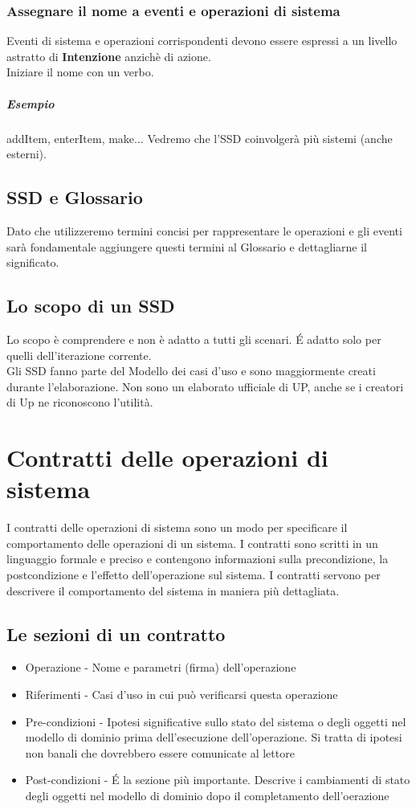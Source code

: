 \subsection*{Assegnare il nome a eventi e operazioni di sistema}
Eventi di sistema e operazioni corrispondenti devono essere espressi a un livello 
astratto di \textbf{Intenzione} anzichè di azione.
\\ Iniziare il nome con un verbo.
\paragraph*{Esempio} addItem, enterItem, make... 
Vedremo che l'SSD coinvolgerà più sistemi (anche esterni).
\section{SSD e Glossario}
Dato che utilizzeremo termini concisi per rappresentare le operazioni e gli eventi sarà fondamentale
aggiungere questi termini al Glossario e dettagliarne il significato.
\section{Lo scopo di un SSD}
Lo scopo è comprendere e non è adatto a tutti gli scenari. \'E adatto solo per quelli dell'iterazione
corrente.
\\ Gli SSD fanno parte del Modello dei casi d'uso e sono maggiormente creati durante l'elaborazione.
Non sono un elaborato ufficiale di UP, anche se i creatori di Up ne riconoscono l'utilità.

\chapter{Contratti delle operazioni di sistema}
I contratti delle operazioni di sistema sono un modo per specificare il comportamento delle operazioni
di un sistema. I contratti sono scritti in un linguaggio formale e preciso e contengono
informazioni sulla precondizione, la postcondizione e l'effetto dell'operazione sul sistema.
I contratti servono per descrivere il comportamento del sistema in maniera più dettagliata.
\section{Le sezioni di un contratto}
\begin{itemize}
    \item Operazione - Nome e parametri (firma) dell'operazione
    \item Riferimenti - Casi d'uso in cui può verificarsi questa operazione
    \item Pre-condizioni - Ipotesi significative sullo stato del sistema o degli oggetti nel modello
    di dominio prima dell'esecuzione dell'operazione. Si tratta di ipotesi non banali che dovrebbero
    essere comunicate al lettore
    \item Post-condizioni - \'E la sezione più importante. Descrive i cambiamenti di stato degli oggetti
    nel modello di dominio dopo il completamento dell'oerazione
\end{itemize}
